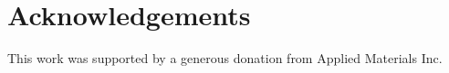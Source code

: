 \documentclass[12pt]{iopart}
\begin{document}
\section{Acknowledgements}
This work was supported by a generous donation from Applied Materials Inc.

\printbibliography %
\end{document}
